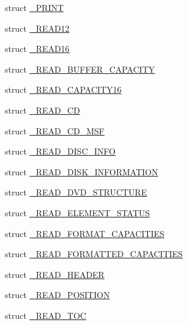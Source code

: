 \begin{DoxyCompactItemize}
\item 
struct \hyperlink{struct___c_d_b_1_1___p_r_i_n_t}{\+\_\+\+P\+R\+I\+NT}
\item 
struct \hyperlink{struct___c_d_b_1_1___r_e_a_d12}{\+\_\+\+R\+E\+A\+D12}
\item 
struct \hyperlink{struct___c_d_b_1_1___r_e_a_d16}{\+\_\+\+R\+E\+A\+D16}
\item 
struct \hyperlink{struct___c_d_b_1_1___r_e_a_d___b_u_f_f_e_r___c_a_p_a_c_i_t_y}{\+\_\+\+R\+E\+A\+D\+\_\+\+B\+U\+F\+F\+E\+R\+\_\+\+C\+A\+P\+A\+C\+I\+TY}
\item 
struct \hyperlink{struct___c_d_b_1_1___r_e_a_d___c_a_p_a_c_i_t_y16}{\+\_\+\+R\+E\+A\+D\+\_\+\+C\+A\+P\+A\+C\+I\+T\+Y16}
\item 
struct \hyperlink{struct___c_d_b_1_1___r_e_a_d___c_d}{\+\_\+\+R\+E\+A\+D\+\_\+\+CD}
\item 
struct \hyperlink{struct___c_d_b_1_1___r_e_a_d___c_d___m_s_f}{\+\_\+\+R\+E\+A\+D\+\_\+\+C\+D\+\_\+\+M\+SF}
\item 
struct \hyperlink{struct___c_d_b_1_1___r_e_a_d___d_i_s_c___i_n_f_o}{\+\_\+\+R\+E\+A\+D\+\_\+\+D\+I\+S\+C\+\_\+\+I\+N\+FO}
\item 
struct \hyperlink{struct___c_d_b_1_1___r_e_a_d___d_i_s_k___i_n_f_o_r_m_a_t_i_o_n}{\+\_\+\+R\+E\+A\+D\+\_\+\+D\+I\+S\+K\+\_\+\+I\+N\+F\+O\+R\+M\+A\+T\+I\+ON}
\item 
struct \hyperlink{struct___c_d_b_1_1___r_e_a_d___d_v_d___s_t_r_u_c_t_u_r_e}{\+\_\+\+R\+E\+A\+D\+\_\+\+D\+V\+D\+\_\+\+S\+T\+R\+U\+C\+T\+U\+RE}
\item 
struct \hyperlink{struct___c_d_b_1_1___r_e_a_d___e_l_e_m_e_n_t___s_t_a_t_u_s}{\+\_\+\+R\+E\+A\+D\+\_\+\+E\+L\+E\+M\+E\+N\+T\+\_\+\+S\+T\+A\+T\+US}
\item 
struct \hyperlink{struct___c_d_b_1_1___r_e_a_d___f_o_r_m_a_t___c_a_p_a_c_i_t_i_e_s}{\+\_\+\+R\+E\+A\+D\+\_\+\+F\+O\+R\+M\+A\+T\+\_\+\+C\+A\+P\+A\+C\+I\+T\+I\+ES}
\item 
struct \hyperlink{struct___c_d_b_1_1___r_e_a_d___f_o_r_m_a_t_t_e_d___c_a_p_a_c_i_t_i_e_s}{\+\_\+\+R\+E\+A\+D\+\_\+\+F\+O\+R\+M\+A\+T\+T\+E\+D\+\_\+\+C\+A\+P\+A\+C\+I\+T\+I\+ES}
\item 
struct \hyperlink{struct___c_d_b_1_1___r_e_a_d___h_e_a_d_e_r}{\+\_\+\+R\+E\+A\+D\+\_\+\+H\+E\+A\+D\+ER}
\item 
struct \hyperlink{struct___c_d_b_1_1___r_e_a_d___p_o_s_i_t_i_o_n}{\+\_\+\+R\+E\+A\+D\+\_\+\+P\+O\+S\+I\+T\+I\+ON}
\item 
struct \hyperlink{struct___c_d_b_1_1___r_e_a_d___t_o_c}{\+\_\+\+R\+E\+A\+D\+\_\+\+T\+OC}

\end{DoxyCompactItemize}
